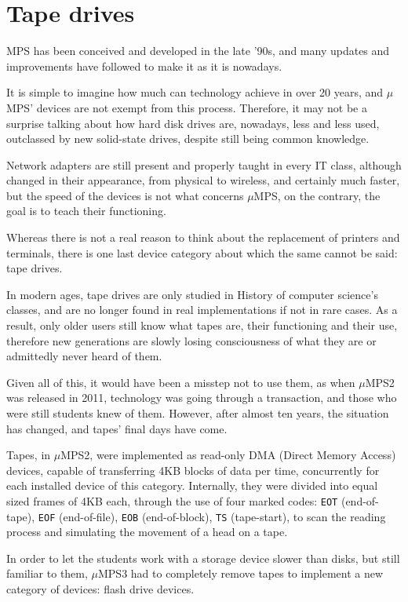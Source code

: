 \documentclass[12pt,a4paper,openright,twoside]{report}
\begin{document}
\section{Tape drives}
	MPS has been conceived and developed in the late '90s, and many updates and improvements have followed to make it as it is nowadays.

	It is simple to imagine how much can technology achieve in over 20 years, and $\mu$MPS' devices are not exempt from this process.
	Therefore, it may not be a surprise talking about how hard disk drives are, nowadays, less and less used, outclassed by new solid-state drives, despite still being common knowledge.

	Network adapters are still present and properly taught in every IT class, although changed in their appearance, from physical to wireless, and certainly much faster, but the speed of the devices is not what concerns $\mu$MPS, on the contrary, the goal is to teach their functioning.

	Whereas there is not a real reason to think about the replacement of printers and terminals, there is one last device category about which the same cannot be said: tape drives.

	In modern ages, tape drives are only studied in History of computer science's classes, and are no longer found in real implementations if not in rare cases.
	As a result, only older users still know what tapes are, their functioning and their use, therefore new generations are slowly losing consciousness of what they are or admittedly never heard of them.

	Given all of this, it would have been a misstep not to use them, as when $\mu$MPS2 was released in 2011, technology was going through a transaction, and those who were still students knew of them. However, after almost ten years, the situation has changed, and tapes' final days have come.
  
	Tapes, in $\mu$MPS2, were implemented as read-only DMA (Direct Memory Access) devices, capable of transferring 4KB blocks of data per time, concurrently for each installed device of this category.
	Internally, they were divided into equal sized frames of 4KB each, through the use of four marked codes: \texttt{EOT} (end-of-tape), \texttt{EOF} (end-of-file), \texttt{EOB} (end-of-block), \texttt{TS} (tape-start), to scan the reading process and simulating the movement of a head on a tape.

	In order to let the students work with a storage device slower than disks, but still familiar to them, $\mu$MPS3 had to completely remove tapes to implement a new category of devices: flash drive devices.
\end{document}
